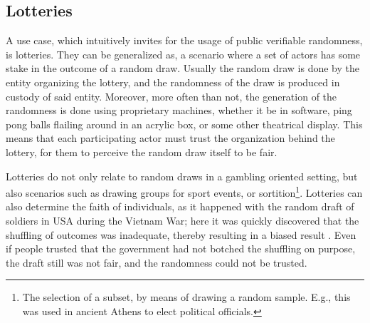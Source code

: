 \subsection{Lotteries}\label{subsec:usecase_lotteries}
A use case, which intuitively invites for the usage of public verifiable randomness, is lotteries.
They can be generalized as, a scenario where a set of actors has some stake in the outcome of a random draw.
Usually the random draw is done by the entity organizing the lottery, and the randomness of the draw is produced in custody of said entity.
Moreover, more often than not, the generation of the randomness is done using proprietary machines, whether it be in software, ping pong balls flailing around in an acrylic box, or some other theatrical display.
This means that each participating actor must trust the organization behind the lottery, for them to perceive the random draw itself to be fair.

Lotteries do not only relate to random draws in a gambling oriented setting, but also scenarios such as drawing groups for sport events, or sortition\footnote{The selection of a subset, by means of drawing a random sample. E.g., this was used in ancient Athens to elect political officials.}.
Lotteries can also determine the faith of individuals, as it happened with the random draft of soldiers in USA during the Vietnam War; here it was quickly discovered that the shuffling of outcomes was inadequate, thereby resulting in a biased result \cite{starr1997nonrandom}.
Even if people trusted that the government had not botched the shuffling on purpose, the draft still was not fair, and the randomness could not be trusted.
